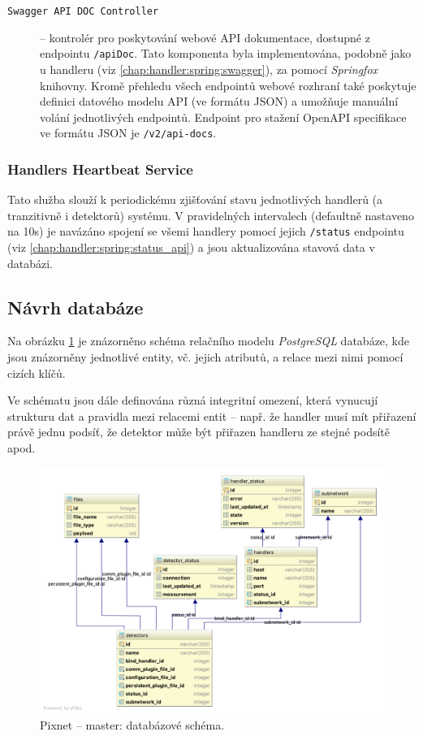 \begin{description}
    \item[\texttt{Swagger API DOC Controller}] -- kontrolér pro poskytování webové API dokumentace, dostupné z endpointu \texttt{/apiDoc}. Tato komponenta byla implementována, podobně jako u handleru (viz \ref{chap:handler:spring:swagger}), za pomocí \textit{Springfox} \cite{springfox} knihovny. Kromě přehledu všech endpointů webové rozhraní také poskytuje definici datového modelu API (ve formátu JSON) a umožňuje manuální volání jednotlivých endpointů. Endpoint pro stažení Open\-API specifikace ve formátu JSON je \texttt{/v2/api-docs}.
\end{description}

\subsubsection{Handlers Heartbeat Service}
Tato služba slouží k periodickému zjišťování stavu jednotlivých handlerů (a tranzitivně i detektorů) systému. V pravidelných intervalech (defaultně nastaveno na \unit{10}{s}) je navázáno spojení se všemi handlery pomocí jejich \texttt{/status} endpointu (viz \ref{chap:handler:spring:status_api}) a jsou aktualizována stavová data v databázi.

\subsection{Návrh databáze}\label{chap:master:backend:db}
Na obrázku \ref{fig:master:db_schema} je znázorněno schéma relačního modelu \textit{PostgreSQL} databáze, kde jsou znázorněny jednotlivé entity, vč. jejich atributů, a relace mezi nimi pomocí cizích klíčů.

Ve schématu jsou dále definována různá integritní omezení, která vynucují strukturu dat a pravidla mezi relacemi entit -- např. že handler musí mít přiřazení právě jednu podsíť, že detektor může být přiřazen handleru ze stejné podsítě apod.

\begin{figure}[h]
	\begin{center}
		\vspace*{0.4cm}
		\includegraphics[width=15cm]{figures/master_db.png}
		\caption{Pixnet -- master: databázové schéma.}
		\label{fig:master:db_schema}
	\end{center}
\end{figure}

